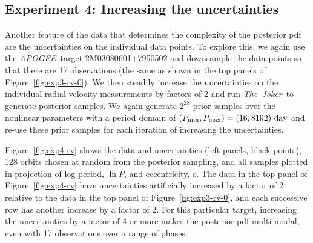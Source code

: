 \documentclass[manuscript, letterpaper]{aastex6}
\newcommand{\project}[1]{\textsl{#1}}
\newcommand{\acronym}[1]{{\small{#1}}}
\newcommand{\apogee}{\project{\acronym{APOGEE}}}
\newcommand{\samplername}{\project{The~Joker}}
\newcommand{\figname}{Figure}
\newcommand{\todoapw}[1]{{\color{red}APW TODO: #1}}
\begin{document}

\subsection{Experiment 4: Increasing the uncertainties}

Another feature of the data that determines the complexity of the posterior pdf
are the uncertainties on the individual data points.
To explore this, we again use the \apogee\ target 2M03080601+7950502 and
downsample the data points so that there are 17 observations (the same as shown
in the top panels of \figname~\ref{fig:exp3-rv-0}).
We then steadily increase the uncertainties on the individual radial velocity
measurements by factors of 2 and run \samplername\ to generate posterior
samples.
We again generate $2^{28}$ prior samples over the nonlinear parameters with a
period domain of $(P_{\rm min}, P_{\rm max}) = (16, 8192)~{\rm day}$ and re-use
these prior samples for each iteration of increasing the uncertainties.

\figname~\ref{fig:exp4-rv} shows the data and uncertainties (left panels, black
points), 128 orbits chosen at random from the posterior sampling, and all
samples plotted in projection of log-period, $\ln P$, and eccentricity, $e$.
The data in the top panel of \figname~\ref{fig:exp4-rv} have uncertainties
artificially increased by a factor of 2 relative to the data in the top panel of
\figname~\ref{fig:exp3-rv-0}, and each successive row has another increase by a
factor of 2.
For this particular target, increasing the uncertainties by a factor of 4 or
more makes the posterior pdf multi-modal, even with 17 observations over a range
of phases.
\end{document}
